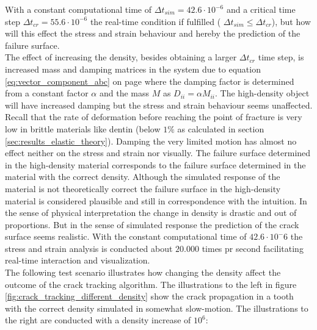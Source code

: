 With a constant computational time of $\Delta t_{sim} = 42.6 \cdot
10^{-6}$ and a critical time step $\Delta t_{cr} = 55.6 \cdot
10^{-6}$ the real-time condition if fulfilled ( $\Delta t_{sim} \le
\Delta t_{cr}$), but how will this effect the stress and strain
behaviour and hereby the prediction of the failure surface. \\

The effect of increasing the density, besides obtaining a larger $\Delta
t_{cr}$ time step, is increased mass and damping matrices in the system due to
equation \eqref{eq:vector_component_abc} on page
\pageref{eq:vector_component_abc} where the damping factor is
determined from a constant factor $\alpha$ and the mass $M$ as $
D_{ii} = \alpha M_{ii}$.
%
The high-density object will have
increased damping but the stress and strain behaviour seems unaffected.
Recall that the rate of deformation before reaching the point of
fracture is very low in brittle materials like dentin (below $1\%$ as
calculated in section \vref{sec:results_elastic_theory}). Damping
the very limited motion has almost no effect neither on the stress and
strain nor visually.
%
The failure surface determined in the high-density material corresponds
to the failure surface determined in the material with the correct density.
Although the simulated response of the material is not theoretically
correct the failure surface in the high-density material is considered
plausible and still in correspondence with the intuition. 
In the sense of physical interpretation the change in
density is drastic and out of proportions. But in the sense of
simulated response the prediction of the crack surface seems
realistic. With the constant computational time of $42.6 \cdot 10^-6$
the stress and strain analysis is conducted about $20.000$ times pr
second facilitating real-time interaction and visualization. \\

The following test scenario illustrates how changing the density
affect the outcome of the crack tracking algorithm. The illustrations
to the left in figure \vref{fig:crack_tracking_different_density}
show the crack propagation in a tooth with the correct density
simulated in somewhat slow-motion. The illustrations to
the right are conducted with a density increase of $10^6$:

